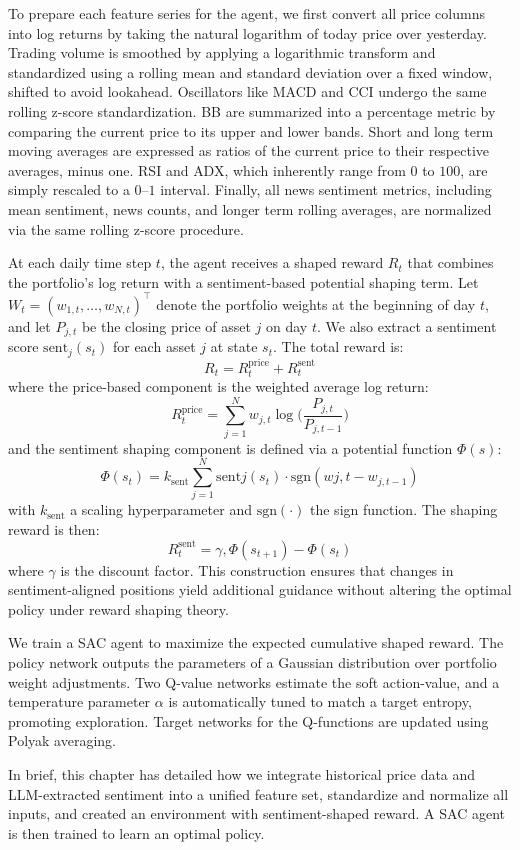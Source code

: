 To prepare each feature series for the agent, we first convert all price columns  into log returns by taking the natural logarithm of today price over yesterday. Trading volume is smoothed by applying a logarithmic transform and standardized using a rolling mean and standard deviation over a fixed window, shifted to avoid lookahead. Oscillators like \gls{MACD} and \gls{CCI} undergo the same rolling z-score standardization. \gls{BB} are summarized into a percentage metric by comparing the current price to its upper and lower bands. Short and long term moving averages are expressed as ratios of the current price to their respective averages, minus one. \gls{RSI} and \gls{ADX}, which inherently range from \(0\) to \(100\), are simply rescaled to a \(0\)–\(1\) interval. Finally, all news sentiment metrics, including mean sentiment, news counts, and longer term rolling averages, are normalized via the same rolling z-score procedure. 

At each daily time step \(t\), the agent receives a shaped reward \(R_t\) that combines the portfolio’s log return with a sentiment-based potential shaping term. Let \(W_t = (w_{1,t},\dots,w_{N,t})^\top\) denote the portfolio weights at the beginning of day \(t\), and let \(P_{j,t}\) be the closing price of asset \(j\) on day \(t\). We also extract a sentiment score \(\mathrm{sent}_j(s_t)\) for each asset \(j\) at state \(s_t\). The total reward is:
\[R_t = R_t^{\mathrm{price}} + R_t^{\mathrm{sent}}\]
where the price-based component is the weighted average log return:
\[R_t^{\mathrm{price}} = \sum_{j=1}^N w_{j,t} \log \biggl(\frac{P_{j,t}}{P_{j,t-1}}\biggr)\]
and the sentiment shaping component is defined via a potential function $\Phi(s)$:
\[\Phi(s_t) = k_{\mathrm{sent}} \sum_{j=1}^N \mathrm{sent}j(s_t) \cdot \mathrm{sgn}(w{j,t} - w_{j,t-1})\]
with \(k_{\mathrm{sent}}\) a scaling hyperparameter and \(\mathrm{sgn}(\cdot)\) the sign function. The shaping reward is then:
\[R_t^{\mathrm{sent}} = \gamma,\Phi(s_{t+1}) - \Phi(s_t)\]
where \(\gamma\) is the discount factor. This construction ensures that changes in sentiment-aligned positions yield additional guidance without altering the optimal policy under reward shaping theory.

We train a \gls{SAC} agent to maximize the expected cumulative shaped reward. The policy network outputs the parameters of a Gaussian distribution over portfolio weight adjustments. Two Q-value networks estimate the soft action-value, and a temperature parameter \(\alpha\) is automatically tuned to match a target entropy, promoting exploration. Target networks for the Q-functions are updated using Polyak averaging.

In brief, this chapter has detailed how we integrate historical price data and \gls{LLM}-extracted sentiment into a unified feature set, standardize and normalize all inputs, and created an environment with sentiment-shaped reward. A \gls{SAC} agent is then trained to learn an optimal policy.
